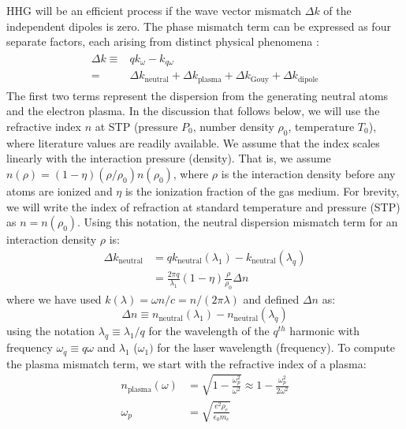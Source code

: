 HHG will be an efficient process if the wave vector mismatch $\Delta k$ of the independent dipoles is zero. The phase mismatch term can be expressed as four separate factors, each arising from distinct physical phenomena \cite{rothhardtAbsorptionlimitedPhasematchedHigh2014}:
\begin{align}
\label{eqn:phase_mismatch}
\begin{split}
\Delta k \equiv & q k_{\omega} - k_{q \omega} \\
=& \Delta k_{\textrm{neutral}} + \Delta k_{\textrm{plasma}} + \Delta k_{\textrm{Gouy}} + \Delta k_{\textrm{dipole}}
\end{split}
\end{align}
The first two terms represent the dispersion from the generating neutral atoms and the electron plasma. In the discussion that follows below, we will use the refractive index $n$ at STP (pressure $P_0$, number density $\rho_0$, temperature $T_0$), where literature values are readily available. We assume that the index scales linearly with the interaction pressure (density). That is, we assume $n(\rho) = (1-\eta)(\rho / \rho_0) n(\rho_0)$, where $\rho$ is the interaction density before any atoms are ionized and $\eta$ is the ionization fraction of the gas medium. For brevity, we will write the index of refraction at standard temperature and pressure (STP) as $n = n(\rho_0)$. Using this notation, the neutral dispersion mismatch term for an interaction density $\rho$ is:
\begin{align}
\Delta k_{\textrm{neutral}} &= q k_{\textrm{neutral}}(\lambda_1) - k_{\textrm{neutral}}(\lambda_{q}) \nonumber \\
&= \frac{2 \pi q}{\lambda_1} (1-\eta) \frac{\rho}{\rho_0}\Delta n
\label{eqn:deltak_neutral}
\end{align}
where we have used $k(\lambda)= \omega n /c = n / (2 \pi \lambda)$ and defined $\Delta n$ as:
\begin{equation}
\Delta n \equiv n_{\textrm{neutral}}(\lambda_1) - n_{\textrm{neutral}}(\lambda_q)
\label{eqn:refractive_index_mismatch}
\end{equation}
using the notation $\lambda_q \equiv \lambda_1 / q$ for the wavelength of the $q^{th}$ harmonic with frequency $\omega_q \equiv q \omega$ and $\lambda_1$ ($\omega_1)$ for the laser wavelength (frequency). To compute the plasma mismatch term, we start with the refractive index of a plasma:
\begin{align}
n_{\textrm{plasma}}(\omega) &= \sqrt{1 - \frac{\omega_p^2}{\omega^2}} \approx 1 - \frac{\omega_p^2}{2 \omega^2} \\
\omega_p &= \sqrt{\frac{e^2 \rho_e}{\epsilon_0 m_e}}
\end{align}
